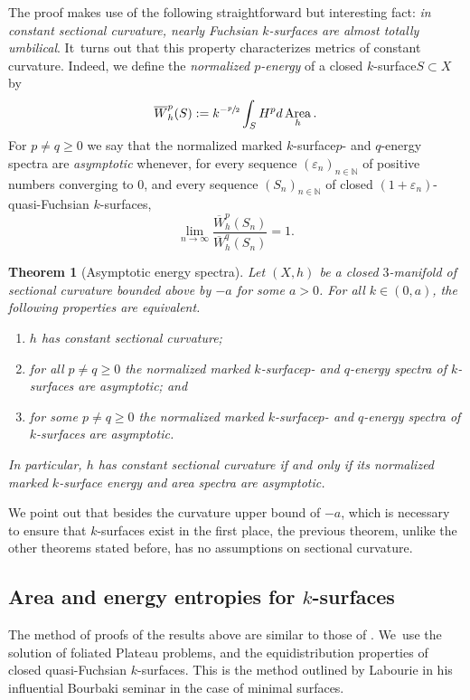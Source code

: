\documentclass[JEP,XML,SOM,Unicode,NoEqCountersInSection,published]{cedram}
\newcommand{\ksurface}{$k$\nobreakdash-surface\xspace}
\newcommand{\ksurfaces}{$k$\nobreakdash-surfaces\xspace}
\theoremstyle{plain}
\newtheorem{theorem}{Theorem}[section]
\theoremstyle{definition}
\newcommand{\N}{{\mathbb N}}
\let\eps\varepsilon
\let\dans\subset
\DeclareMathOperator{\Area}{Area}
\begin{document}
The proof makes use of the following straightforward but interesting fact: \emph{in constant sectional curvature, nearly Fuchsian \ksurfaces are almost totally umbilical}. It~turns out that this property characterizes metrics of constant curvature. Indeed, we define the \emph{normalized $p$-energy} of a closed \ksurface $S\dans X$ by
\begin{equation*}
\overline{W}^{p}_h(S) := k^{-\sfrac{p}{2}}\int_S H^p d\Area_h.
\end{equation*}
For $p\neq q\geq 0$ we say that the normalized marked \ksurface $p$- and $q$-energy spectra are \emph{asymptotic} whenever, for every sequence $(\eps_n)_{n\in\N}$ of positive numbers converging to $0$, and every sequence $(S_n)_{n\in\N}$ of closed $(1+\eps_n)$-quasi-Fuchsian \ksurfaces,
\begin{equation*}
\lim_{n\to\infty}\frac{\overline{W}^{p}_h(S_n)}{\overline{W}^{q}_h(S_n)}=1.
\end{equation*}

\begin{theorem}[Asymptotic energy spectra]\label{thm.asymptotic_spectra}
Let $(X,h)$ be a closed $3$\nobreakdash-manifold of sectional curvature bounded above by $-a$ for some $a>0$. For all $k\in(0,a)$, the following properties are equivalent.
\begin{enumerate}
\item $h$ has constant sectional curvature;
\item for all $p\neq q\geq 0$ the normalized marked \ksurface $p$- and $q$-energy spectra of \ksurfaces are asymptotic; and
\item for some $p\neq q\geq 0$ the normalized marked \ksurface $p$- and $q$-energy spectra of \ksurfaces are asymptotic.
\end{enumerate}
\noindent In particular, $h$ has constant sectional curvature if and only if its normalized marked \ksurface energy and area spectra are asymptotic.
\end{theorem}

We point out that besides the curvature upper bound of $-a$, which is necessary to ensure that \ksurfaces exist in the first place, the previous theorem, unlike the other theorems stated before, has no assumptions on sectional curvature.

\subsection{Area and energy entropies for \ksurfaces} The method of proofs of the results above are similar to those of \cite{ALS}. We~use the solution of foliated Plateau problems, and the equidistribution properties of closed quasi-Fuchsian \ksurfaces. This is the method outlined by Labourie in his influential Bourbaki seminar \cite{LabourieBourbaki} in the case of minimal surfaces.
\end{document}
